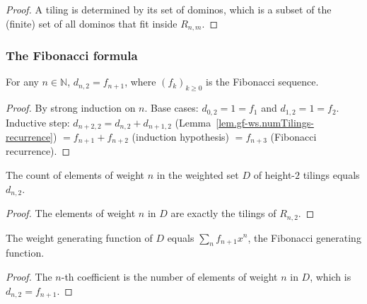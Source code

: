 \begin{proof}
\leanok
A tiling is determined by its set of dominos, which is a subset of the
(finite) set of all dominos that fit inside $R_{n,m}$.
\end{proof}

\subsubsection{The Fibonacci formula}

\begin{lemma}
\label{lem.gf-ws.numTilings-2-n}
\leanhelper
\leanok
For any $n \in \mathbb{N}$, $d_{n,2} = f_{n+1}$, where $(f_k)_{k \ge 0}$ is
the Fibonacci sequence.
\end{lemma}

\begin{proof}
\leanok
By strong induction on $n$. Base cases: $d_{0,2} = 1 = f_1$ and
$d_{1,2} = 1 = f_2$. Inductive step: $d_{n+2,2} = d_{n,2} + d_{n+1,2}$
(Lemma~\ref{lem.gf-ws.numTilings-recurrence}) $= f_{n+1} + f_{n+2}$
(induction hypothesis) $= f_{n+3}$ (Fibonacci recurrence).
\end{proof}

\begin{lemma}
\label{lem.gf-ws.countOfWeight-tilingsHeight2}
\leanhelper
\leanok
The count of elements of weight $n$ in the weighted set $D$ of height-$2$
tilings equals $d_{n,2}$.
\end{lemma}

\begin{proof}
\leanok
The elements of weight $n$ in $D$ are exactly the tilings of $R_{n,2}$.
\end{proof}

\begin{lemma}
\label{lem.gf-ws.weightGenFun-tilingsHeight2}
\leanhelper
\leanok
The weight generating function of $D$ equals $\sum_n f_{n+1} x^n$, the
Fibonacci generating function.
\end{lemma}

\begin{proof}
\leanok
The $n$-th coefficient is the number of elements of weight $n$ in $D$, which is $d_{n,2} = f_{n+1}$.
\end{proof}
